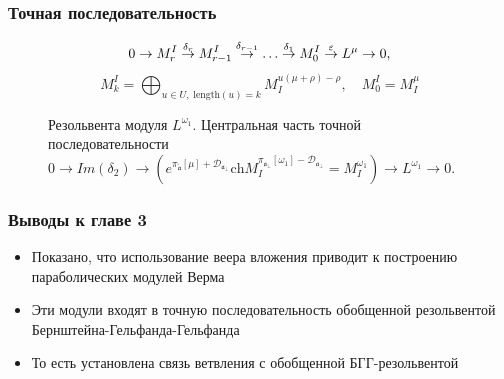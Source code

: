 \documentclass[pdftex]{beamer}
\newcommand{\afb}{\mathfrak{a}_{\bot}}
\newcommand{\aft}{\widetilde{\mathfrak{a}}}
\theoremstyle{definition} \newtheorem{Def}{Определение}
\begin{document}
\begin{frame}
  \frametitle{Точная последовательность}
  \begin{equation*}
    0\rightarrow M_{r}^{I}\overset{\delta _{r}}{\rightarrow }M_{r-1}^{I}\overset{%
      \delta _{r-1}}{\rightarrow }\ldots \overset{\delta _{1}}{\rightarrow }%
    M_{0}^{I}\overset{\varepsilon }{\rightarrow }L^{\mu }\rightarrow 0,
  \end{equation*}
  \begin{equation*}
    M_{k}^{I}=\bigoplus_{u\in U,\;\mathrm{length}\left( u\right)
      =k}M_{I}^{u\left( \mu +\rho \right) -\rho },\quad M_{0}^{I}=M_{I}^{\mu }
  \end{equation*}
  \vspace{-0.5cm}
  \begin{figure}[h!bt]
    \noindent{}
\vspace{-0.5cm}
    \caption{
      Резольвента модуля $L^{\omega_1}$.  Центральная часть точной последовательности
      $0 \to Im(\delta_2) \to \left( e^{\pi _{\aft}\left[ \mu \right] + \mathcal{D}_{\afb}}\mathrm{ch}M_{I}^{\pi _{\afb}\left[ \omega_1 \right] -
          \mathcal{D}_{\afb} }=M^{\omega_1}_{I}\right) \to
      L^{\omega_1}\to 0 $.  
    }
  \end{figure}
\end{frame}
\begin{frame}
  \frametitle{Выводы к главе 3}
  \begin{itemize}
  \item Показано, что использование веера вложения приводит к построению параболических модулей Верма
  \item Эти модули входят в точную последовательность обобщенной резольвентой Бернштейна-Гельфанда-Гельфанда
  \item То есть установлена связь ветвления с обобщенной БГГ-резольвентой
  \end{itemize}
\end{frame}
\end{document}
